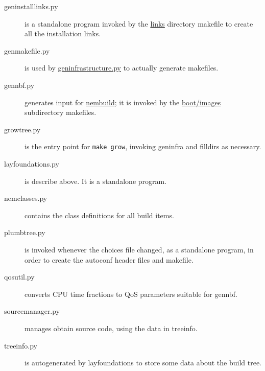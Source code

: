 \documentclass[a4paper]{article}
\newcommand{\cmd}[1]{\texttt{#1}}
\begin{document}
\begin{description}
\item[geninstalllinks.py] is a standalone program invoked by the
\url{links} directory makefile to create all the installation links.

\item[genmakefile.py] is used by \url{geninfrastructure.py} to
actually generate makefiles.

\item[gennbf.py] generates input for \url{nembuild}; it is invoked by
the \url{boot/images} subdirectory makefiles.

\item[growtree.py] is the entry point for \cmd{make grow}, invoking geninfra
and filldirs as necessary.

\item[layfoundations.py] is describe above. It is a standalone program.

\item[nemclasses.py] contains the class definitions for all build
items.

\item[plumbtree.py] is invoked whenever the choices file changed, as a
standalone program, in order to create the autoconf header files and
makefile.

\item[qosutil.py] converts CPU time fractions to QoS parameters
suitable for gennbf.

\item[sourcemanager.py] manages obtain source code, using the data in
treeinfo.

\item[treeinfo.py] is autogenerated by layfoundations to store some
data about the build tree.

\end{description}
\end{document}
